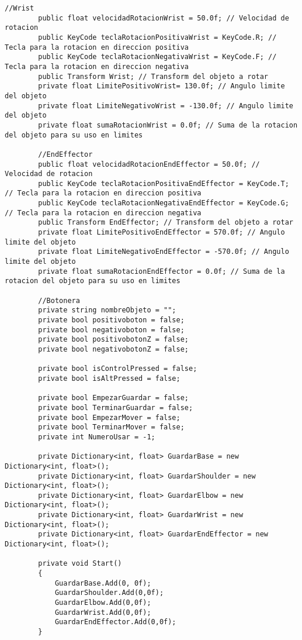 \begin{lstlisting}[frame=single]
        //Wrist
        public float velocidadRotacionWrist = 50.0f; // Velocidad de rotacion
        public KeyCode teclaRotacionPositivaWrist = KeyCode.R; // Tecla para la rotacion en direccion positiva
        public KeyCode teclaRotacionNegativaWrist = KeyCode.F; // Tecla para la rotacion en direccion negativa
        public Transform Wrist; // Transform del objeto a rotar
        private float LimitePositivoWrist= 130.0f; // Angulo limite del objeto
        private float LimiteNegativoWrist = -130.0f; // Angulo limite del objeto
        private float sumaRotacionWrist = 0.0f; // Suma de la rotacion del objeto para su uso en limites

        //EndEffector
        public float velocidadRotacionEndEffector = 50.0f; // Velocidad de rotacion
        public KeyCode teclaRotacionPositivaEndEffector = KeyCode.T; // Tecla para la rotacion en direccion positiva
        public KeyCode teclaRotacionNegativaEndEffector = KeyCode.G; // Tecla para la rotacion en direccion negativa
        public Transform EndEffector; // Transform del objeto a rotar
        private float LimitePositivoEndEffector = 570.0f; // Angulo limite del objeto
        private float LimiteNegativoEndEffector = -570.0f; // Angulo limite del objeto
        private float sumaRotacionEndEffector = 0.0f; // Suma de la rotacion del objeto para su uso en limites

        //Botonera
        private string nombreObjeto = "";
        private bool positivoboton = false;
        private bool negativoboton = false;
        private bool positivobotonZ = false;
        private bool negativobotonZ = false;

        private bool isControlPressed = false;
        private bool isAltPressed = false;

        private bool EmpezarGuardar = false;
        private bool TerminarGuardar = false;
        private bool EmpezarMover = false;
        private bool TerminarMover = false;
        private int NumeroUsar = -1;

        private Dictionary<int, float> GuardarBase = new Dictionary<int, float>();
        private Dictionary<int, float> GuardarShoulder = new Dictionary<int, float>();
        private Dictionary<int, float> GuardarElbow = new Dictionary<int, float>();
        private Dictionary<int, float> GuardarWrist = new Dictionary<int, float>();
        private Dictionary<int, float> GuardarEndEffector = new Dictionary<int, float>();

        private void Start()
        {
            GuardarBase.Add(0, 0f);
            GuardarShoulder.Add(0,0f);
            GuardarElbow.Add(0,0f);
            GuardarWrist.Add(0,0f);
            GuardarEndEffector.Add(0,0f);
        }


\end{lstlisting}
